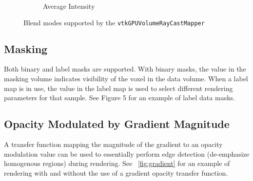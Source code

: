 \begin{figure}[htbp]
\begin{subfigure}{.5\columnwidth}
    \caption{Average Intensity}
    \label{fig:blendaverage}
  \end{subfigure}
  \caption{Blend modes supported by the \texttt{vtkGPUVolumeRayCastMapper}}
  \label{fig:blendingmodes}
\end{figure}

\subsection{Masking}
Both binary and label masks are supported. With binary masks, the value in the
masking volume indicates visibility of the voxel in the data volume. When a
label map is in use, the value in the label map is used to select different
rendering parameters for that sample.  See Figure 5 for an example of label data
masks.

\subsection{Opacity Modulated by Gradient Magnitude} A transfer function
mapping the magnitude of the gradient to an opacity modulation value can be used
to essentially perform edge detection (de-emphasize homogenous regions) during
rendering. See ~\ref{fig:gradient} for an example of rendering with and without
the use of a gradient opacity transfer function.

